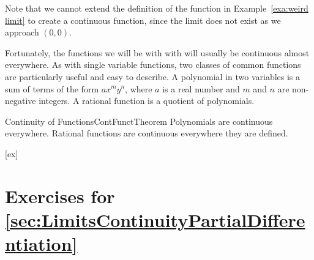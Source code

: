 Note that we cannot extend the definition of the function in Example~\ref{exa:weird limit}
to create a continuous function, since the limit does not exist as we approach $(0,0)$.

Fortunately, the functions we will be with with will usually be
continuous almost everywhere.
As with single variable functions, two classes of common functions are
particularly useful and easy to describe. A
polynomial in two
variables is a sum of terms of the form $ax^my^n$, where $a$ is a real
number and $m$ and $n$ are non-negative integers. A rational
function
is a quotient of polynomials.

\begin{theorem}{Continuity of Functions}{ContFunctTheorem}
Polynomials are continuous everywhere. Rational functions are
continuous everywhere they are defined.
\end{theorem}


[ex]
\section*{Exercises for \ref{sec:LimitsContinuityPartialDifferentiation}}


